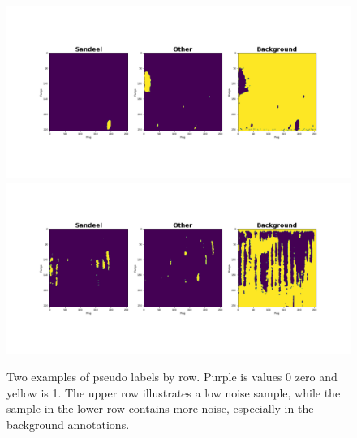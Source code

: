         \clearpage
        \begin{figure}[H]
            \centering
            \includegraphics[scale=0.32]{figures/data_sample.png}
          	\includegraphics[scale=0.32]{figures/data_sample_noisy.png}
            \caption{Two examples of pseudo labels by row. Purple is values 0 zero and yellow is 1. The upper row illustrates a low noise sample, while the sample in the lower row contains more noise, especially in the background annotations.}
            \label{data sample fig}
        \end{figure}        
        
        

